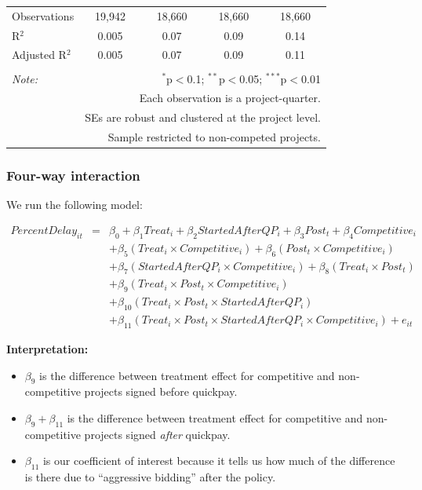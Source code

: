 \documentclass[]{article}
\providecommand{\tightlist}{%
  \setlength{\itemsep}{0pt}\setlength{\parskip}{0pt}}
\begin{document}
\begin{table}[H]
\begin{tabular}{@{\extracolsep{-2pt}}lcccc}
Observations & 19,942 & 18,660 & 18,660 & 18,660 \\ 
R$^{2}$ & 0.005 & 0.07 & 0.09 & 0.14 \\ 
Adjusted R$^{2}$ & 0.005 & 0.07 & 0.09 & 0.11 \\ 
\hline 
\hline \\[-1.8ex] 
\textit{Note:}  & \multicolumn{4}{r}{$^{*}$p$<$0.1; $^{**}$p$<$0.05; $^{***}$p$<$0.01} \\ 
 & \multicolumn{4}{r}{Each observation is a project-quarter.} \\ 
 & \multicolumn{4}{r}{SEs are robust and clustered at the project level.} \\ 
 & \multicolumn{4}{r}{Sample restricted to non-competed projects.} \\ 
\end{tabular} 
\end{table}

\hypertarget{four-way-interaction}{%
\subsubsection{Four-way interaction}\label{four-way-interaction}}

We run the following model:

\[\begin{aligned} PercentDelay_{it} &=& \beta_0 +\beta_1 Treat_i+ \beta_2 StartedAfterQP_i+ \beta_3 Post_t+ \beta_4 Competitive_i\\ && +  \beta_5 (Treat_i \times Competitive_i) + \beta_6 (Post_t \times Competitive_i)\\ && +  \beta_7 (StartedAfterQP_i \times Competitive_i) +\beta_8 (Treat_i \times Post_t)\\ && + \beta_9 (Treat_i \times Post_t \times Competitive_i) \\ && + \beta_{10} (Treat_i \times Post_t \times StartedAfterQP_i )\\ && + \beta_{11} (Treat_i \times Post_t \times StartedAfterQP_i \times Competitive_i) + e_{it} \end{aligned}\]

\textbf{Interpretation:}

\begin{itemize}
\tightlist
\item
  \(\beta_9\) is the difference between treatment effect for competitive
  and non-competitive projects signed before quickpay.
\item
  \(\beta_9 + \beta_{11}\) is the difference between treatment effect
  for competitive and non-competitive projects signed \emph{after}
  quickpay.
\item
  \(\beta_{11}\) is our coefficient of interest because it tells us how
  much of the difference is there due to ``aggressive bidding'' after
  the policy.
\end{itemize}
\end{document}
